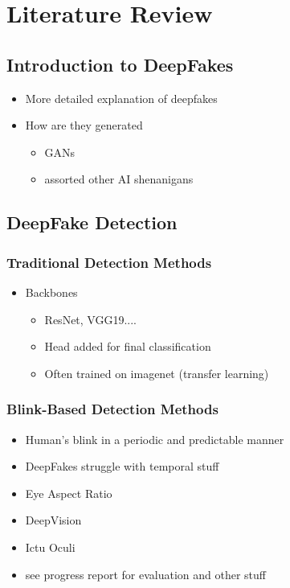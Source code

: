 \chapter{Literature Review}
\label{ch:background}

\section{Introduction to DeepFakes}

\begin{itemize}
    \item More detailed explanation of deepfakes
    \item How are they generated
    \begin{itemize}
        \item GANs
        \item assorted other AI shenanigans
    \end{itemize}
\end{itemize}

\section{DeepFake Detection}

\subsection{Traditional Detection Methods}

\begin{itemize}
    \item Backbones
    \begin{itemize}
        \item ResNet, VGG19....
        \item Head added for final classification
        \item Often trained on imagenet (transfer learning)
    \end{itemize}
\end{itemize}

\subsection{Blink-Based Detection Methods}

\begin{itemize}
    \item Human's blink in a periodic and predictable manner
    \item DeepFakes struggle with temporal stuff
    \item Eye Aspect Ratio
    \item DeepVision
    \item Ictu Oculi
    \item see progress report for evaluation and other stuff
\end{itemize}


